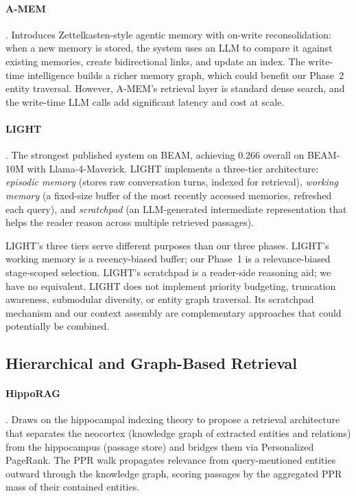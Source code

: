 \documentclass[11pt]{article}
\begin{document}
\paragraph{A-MEM} \citep{Xu2025}.
Introduces Zettelkasten-style agentic memory with on-write
reconsolidation: when a new memory is stored, the system uses an LLM
to compare it against existing memories, create bidirectional links,
and update an index.  The write-time intelligence builds a richer
memory graph, which could benefit our Phase~2 entity traversal.
However, A-MEM's retrieval layer is standard dense search, and the
write-time LLM calls add significant latency and cost at scale.

\paragraph{LIGHT} \citep{Tavakoli2026}.
The strongest published system on BEAM, achieving 0.266 overall on
BEAM-10M with Llama-4-Maverick.  LIGHT implements a three-tier
architecture: \emph{episodic memory} (stores raw conversation turns,
indexed for retrieval), \emph{working memory} (a fixed-size buffer
of the most recently accessed memories, refreshed each query), and
\emph{scratchpad} (an LLM-generated intermediate representation that
helps the reader reason across multiple retrieved passages).

LIGHT's three tiers serve different purposes than our three phases.
LIGHT's working memory is a recency-biased buffer; our Phase~1 is a
relevance-biased stage-scoped selection.  LIGHT's scratchpad is a
reader-side reasoning aid; we have no equivalent.  LIGHT does not
implement priority budgeting, truncation awareness, submodular
diversity, or entity graph traversal.  Its scratchpad mechanism and
our context assembly are complementary approaches that could
potentially be combined.

\subsection{Hierarchical and Graph-Based Retrieval}
\label{sec:hierarchical}

\paragraph{HippoRAG} \citep{Gutierrez2024}.
Draws on the hippocampal indexing theory \citep{Teyler2007} to propose
a retrieval architecture that separates the neocortex (knowledge graph
of extracted entities and relations) from the hippocampus (passage
store) and bridges them via Personalized PageRank.  The PPR walk
propagates relevance from query-mentioned entities outward through
the knowledge graph, scoring passages by the aggregated PPR mass of
their contained entities.
\end{document}
